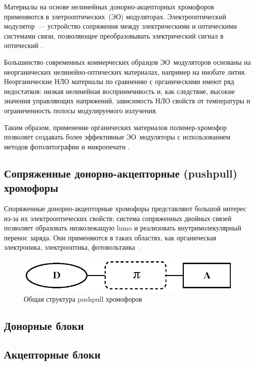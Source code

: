 Материалы на основе нелинейных донорно-акцепторных хромофоров применяются в элетрооптических~(ЭО) модуляторах. Электрооптический модулятор~--- устройство сопряжения между электрическими и оптическими системами связи, позволяющее преобразовывать электрический сигнал в оптический \cite{2016b}.

Большинство современных коммерческих образцов ЭО~модуляторов основаны на неорганических нелинейно-оптических материалах, например на ниобате лития. Неорганические НЛО материалы по сравнению с органическими имеют ряд недостатков: низкая нелинейная восприимчивость и, как следствие, высокие значения управляющих напряжений, зависимость НЛО свойств от температуры и ограниченность полосы модулируемого излучения.

Таким образом, применение органических материалов полимер-хромофор позволяет создавать более эффективные ЭО~модуляторы с использованием методов фотолитографии и микропечати \cite{Han2018}.

\subsection{Сопряженные донорно-акцепторные (\ac{pushpull}) хромофоры}

Споряженные донорно-акцепторные хромофоры представляют большой интерес из-за их электрооптических свойств: система сопряженных двойных связей позволяет образовать низколежащую \ac{lumo} и реализовать внутримолекулярный перенос заряда. Они применяются в таких областях, как органическая электроника, электрооптика, фотовольтаика~\cite{Bures2014a}.

\begin{figure}
    \centering
    \includegraphics{sections/literature/img/D-p-A_chromophores.eps}
    \caption{Общая структура \ac{pushpull} хромофоров}
    \label{fig:D-p-A_chromophores}
\end{figure}

\subsection{Донорные блоки}

\subsection{Акцепторные блоки}

